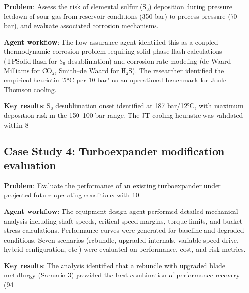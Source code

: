 \documentclass[review,3p]{elsarticle}
\begin{document}
\textbf{Problem}: Assess the risk of elemental sulfur (S₈) deposition during pressure letdown of sour gas from reservoir conditions (350 bar) to process pressure (70 bar), and evaluate associated corrosion mechanisms.

\textbf{Agent workflow}: The flow assurance agent identified this as a coupled thermodynamic-corrosion problem requiring solid-phase flash calculations (TPSolid flash for S₈ desublimation) and corrosion rate modeling (de Waard–Milliams for CO₂, Smith–de Waard for H₂S). The researcher identified the empirical heuristic "5°C per 10 bar" as an operational benchmark for Joule–Thomson cooling.

\textbf{Key results}: S₈ desublimation onset identified at 187 bar/12°C, with maximum deposition risk in the 150–100 bar range. The JT cooling heuristic was validated within 8%

\subsection{Case Study 4: Turboexpander modification evaluation}

\textbf{Problem}: Evaluate the performance of an existing turboexpander under projected future operating conditions with 10%

\textbf{Agent workflow}: The equipment design agent performed detailed mechanical analysis including shaft speeds, critical speed margins, torque limits, and bucket stress calculations. Performance curves were generated for baseline and degraded conditions. Seven scenarios (rebundle, upgraded internals, variable-speed drive, hybrid configuration, etc.) were evaluated on performance, cost, and risk metrics.

\textbf{Key results}: The analysis identified that a rebundle with upgraded blade metallurgy (Scenario 3) provided the best combination of performance recovery (94%
\end{document}
